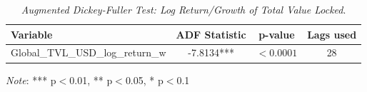 \begin{table}[h]
  \centering
  \caption{\textit{Augmented Dickey-Fuller Test: Log Return/Growth of Total Value Locked}.}
  \label{tab:adftvlafterwins20182025}
  \begin{tabular}{lccc}
    \toprule
    \textbf{Variable} & \textbf{ADF Statistic} & \textbf{p-value} & \textbf{Lags used} \\ 
    \midrule
    Global\_TVL\_USD\_log\_return\_w & -7.8134*** & $< 0.0001$ & 28 \\ 
    \bottomrule
  \end{tabular}
  \vspace{2pt}
  \footnotesize{\textit{Note}: *** p$<$0.01, ** p$<$0.05, * p$<$0.1}\\
\end{table}